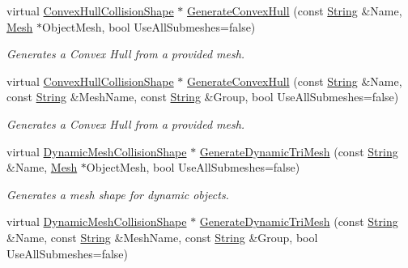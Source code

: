 \begin{DoxyCompactItemize}
virtual \hyperlink{classMezzanine_1_1ConvexHullCollisionShape}{ConvexHullCollisionShape} $\ast$ \hyperlink{classMezzanine_1_1CollisionShapeManager_ad451a46f1e1f5c9054eaa5a3ce4dce0d}{GenerateConvexHull} (const \hyperlink{namespaceMezzanine_acf9fcc130e6ebf08e3d8491aebcf1c86}{String} \&Name, \hyperlink{classMezzanine_1_1Mesh}{Mesh} $\ast$ObjectMesh, bool UseAllSubmeshes=false)
\begin{DoxyCompactList}\small\item\em Generates a Convex Hull from a provided mesh. \item\end{DoxyCompactList}\item 
virtual \hyperlink{classMezzanine_1_1ConvexHullCollisionShape}{ConvexHullCollisionShape} $\ast$ \hyperlink{classMezzanine_1_1CollisionShapeManager_a67c2191c9e52a29744889cf531c1bb30}{GenerateConvexHull} (const \hyperlink{namespaceMezzanine_acf9fcc130e6ebf08e3d8491aebcf1c86}{String} \&Name, const \hyperlink{namespaceMezzanine_acf9fcc130e6ebf08e3d8491aebcf1c86}{String} \&MeshName, const \hyperlink{namespaceMezzanine_acf9fcc130e6ebf08e3d8491aebcf1c86}{String} \&Group, bool UseAllSubmeshes=false)
\begin{DoxyCompactList}\small\item\em Generates a Convex Hull from a provided mesh. \item\end{DoxyCompactList}\item 
virtual \hyperlink{classMezzanine_1_1DynamicMeshCollisionShape}{DynamicMeshCollisionShape} $\ast$ \hyperlink{classMezzanine_1_1CollisionShapeManager_a37f0afd29d955826e19e875eaf97cd44}{GenerateDynamicTriMesh} (const \hyperlink{namespaceMezzanine_acf9fcc130e6ebf08e3d8491aebcf1c86}{String} \&Name, \hyperlink{classMezzanine_1_1Mesh}{Mesh} $\ast$ObjectMesh, bool UseAllSubmeshes=false)
\begin{DoxyCompactList}\small\item\em Generates a mesh shape for dynamic objects. \item\end{DoxyCompactList}\item 
virtual \hyperlink{classMezzanine_1_1DynamicMeshCollisionShape}{DynamicMeshCollisionShape} $\ast$ \hyperlink{classMezzanine_1_1CollisionShapeManager_a6f29c280a1b4f779d3f4cbe6beca219c}{GenerateDynamicTriMesh} (const \hyperlink{namespaceMezzanine_acf9fcc130e6ebf08e3d8491aebcf1c86}{String} \&Name, const \hyperlink{namespaceMezzanine_acf9fcc130e6ebf08e3d8491aebcf1c86}{String} \&MeshName, const \hyperlink{namespaceMezzanine_acf9fcc130e6ebf08e3d8491aebcf1c86}{String} \&Group, bool UseAllSubmeshes=false)

\end{DoxyCompactItemize}
